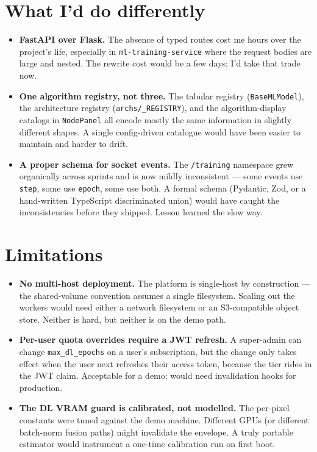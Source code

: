 \documentclass[12pt, a4paper]{report}
\begin{document}
\section{What I'd do differently}

\begin{itemize}
    \item \textbf{FastAPI over Flask.} The absence of typed routes
        cost me hours over the project's life, especially in
        \texttt{ml-training-service} where the request bodies are
        large and nested. The rewrite cost would be a few days; I'd
        take that trade now.
    \item \textbf{One algorithm registry, not three.} The tabular
        registry (\texttt{BaseMLModel}), the architecture registry
        (\texttt{archs/\_REGISTRY}), and the algorithm-display
        catalogs in \texttt{NodePanel} all encode mostly the same
        information in slightly different shapes. A single
        config-driven catalogue would have been easier to maintain
        and harder to drift.
    \item \textbf{A proper schema for socket events.} The
        \texttt{/training} namespace grew organically across sprints
        and is now mildly inconsistent --- some events use
        \texttt{step}, some use \texttt{epoch}, some use both. A
        formal schema (Pydantic, Zod, or a hand-written TypeScript
        discriminated union) would have caught the inconsistencies
        before they shipped. Lesson learned the slow way.
\end{itemize}

\section{Limitations}

\begin{itemize}
    \item \textbf{No multi-host deployment.} The platform is
        single-host by construction --- the shared-volume convention
        assumes a single filesystem. Scaling out the workers would
        need either a network filesystem or an S3-compatible object
        store. Neither is hard, but neither is on the demo path.
    \item \textbf{Per-user quota overrides require a JWT refresh.} A
        super-admin can change \texttt{max\_dl\_epochs} on a user's
        subscription, but the change only takes effect when the user
        next refreshes their access token, because the tier rides in
        the JWT claim. Acceptable for a demo; would need invalidation
        hooks for production.
    \item \textbf{The DL VRAM guard is calibrated, not modelled.} The
        per-pixel constants were tuned against the demo machine.
        Different GPUs (or different batch-norm fusion paths) might
        invalidate the envelope. A truly portable estimator would
        instrument a one-time calibration run on first boot.
\end{itemize}
\end{document}
